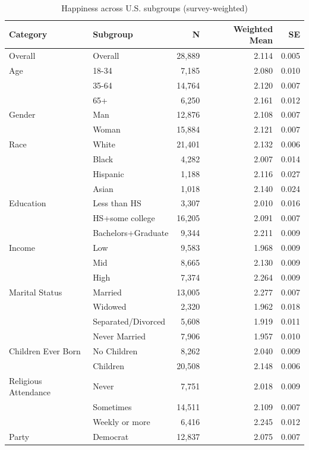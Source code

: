\begin{table}[htbp]
\centering
\caption{Happiness across U.S. subgroups (survey-weighted)}
\begin{tabular}{llrrr}
\toprule
Category & Subgroup & N & Weighted Mean & SE \\
\midrule
Overall & Overall & 28,889 & 2.114 & 0.005 \\
\midrule
Age & 18-34 & 7,185 & 2.080 & 0.010 \\
 & 35-64 & 14,764 & 2.120 & 0.007 \\
 & 65+ & 6,250 & 2.161 & 0.012 \\
\midrule
Gender & Man & 12,876 & 2.108 & 0.007 \\
 & Woman & 15,884 & 2.121 & 0.007 \\
\midrule
Race & White & 21,401 & 2.132 & 0.006 \\
 & Black & 4,282 & 2.007 & 0.014 \\
 & Hispanic & 1,188 & 2.116 & 0.027 \\
 & Asian & 1,018 & 2.140 & 0.024 \\
\midrule
Education & Less than HS & 3,307 & 2.010 & 0.016 \\
 & HS+some college & 16,205 & 2.091 & 0.007 \\
 & Bachelors+Graduate & 9,344 & 2.211 & 0.009 \\
\midrule
Income & Low & 9,583 & 1.968 & 0.009 \\
 & Mid & 8,665 & 2.130 & 0.009 \\
 & High & 7,374 & 2.264 & 0.009 \\
\midrule
Marital Status & Married & 13,005 & 2.277 & 0.007 \\
 & Widowed & 2,320 & 1.962 & 0.018 \\
 & Separated/Divorced & 5,608 & 1.919 & 0.011 \\
 & Never Married & 7,906 & 1.957 & 0.010 \\
\midrule
Children Ever Born & No Children & 8,262 & 2.040 & 0.009 \\
 & Children & 20,508 & 2.148 & 0.006 \\
\midrule
Religious Attendance & Never & 7,751 & 2.018 & 0.009 \\
 & Sometimes & 14,511 & 2.109 & 0.007 \\
 & Weekly or more & 6,416 & 2.245 & 0.012 \\
\midrule
Party & Democrat & 12,837 & 2.075 & 0.007 \\

\end{tabular}
\end{table}
